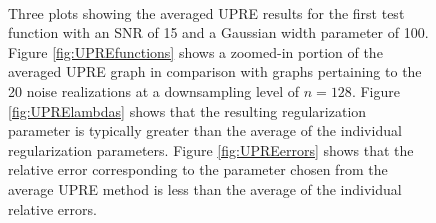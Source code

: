 \begin{figure}
	\centering
     \\
    \caption[]{\doublespace Three plots showing the averaged UPRE results for the first test function with an SNR of 15 and  a Gaussian width parameter of 100. Figure \ref{fig:UPREfunctions} shows a zoomed-in portion of the averaged UPRE graph in comparison with graphs pertaining to the 20 noise realizations at a downsampling level of $n = 128$. Figure \ref{fig:UPRElambdas} shows that the resulting regularization parameter is typically greater than the average of the individual regularization parameters. Figure \ref{fig:UPREerrors} shows that the relative error corresponding to the parameter chosen from the average UPRE method is less than the average of the individual relative errors.}
\label{fig:UPREplots}
\end{figure} 

